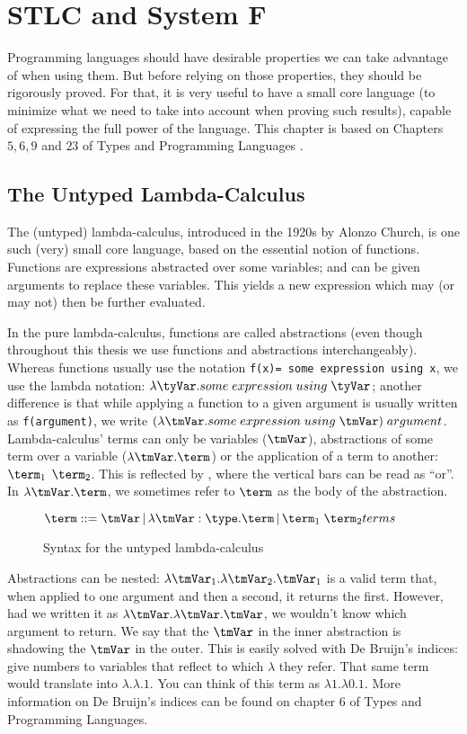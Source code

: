 \chapter{STLC and System F}
\label{cha:2}
Programming languages should have desirable properties we can take advantage of when using them. But before relying on those properties, they should be rigorously proved. For that, it is very useful to have a small core language (to minimize what we need to take into account when proving such results), capable of expressing the full power of the language. This chapter is based on Chapters $5,6,9$ and $23$ of Types and Programming Languages \cite{tapl}.

\section{The Untyped Lambda-Calculus}
The (untyped) lambda-calculus, introduced in the 1920s by Alonzo Church, is one such (very) small core language, based on the essential notion of functions. Functions are expressions abstracted over some variables; and can be given arguments to replace these variables. This yields a new expression which may (or may not) then be further evaluated.

In the pure lambda-calculus, functions are called abstractions (even though throughout this thesis we use functions and abstractions interchangeably). Whereas functions usually use the notation \texttt{f(x)= some expression using x}, we use the lambda notation: $\lambda \tyVar . some\;expression\;using\; \tyVar$; another difference is that while applying a function to a given argument is usually written as \texttt{f(argument)}, we write $(\lambda \tmVar . some\; expression\; using\;\tmVar) \; argument$. Lambda-calculus' terms can only be variables ($\tmVar$), abstractions of some term over a variable ($\lambda \tmVar. \term$) or the application of a term to another: $\term_1$ $\term_2$. This is reflected by , where the vertical bars can be read as ``or''. In $\lambda \tmVar. \term$, we sometimes refer to $\term$ as the body of the abstraction.

\begin{figure}
  \centering
  $\term ::= \tmVar\,|\,\lambda \tmVar:\type.\term\,|\,\term_1 \; \term_2  \hfill terms $\\
  \caption{Syntax for the untyped lambda-calculus}
  \label{untypedsyntax}
\end{figure}
Abstractions can be nested: $\lambda \tmVar_1. \lambda \tmVar_2 .\tmVar_1$ is a valid term that, when applied to one argument and then a second, it returns the first. However, had we written it as $\lambda \tmVar. \lambda \tmVar. \tmVar$, we wouldn't know which argument to return. We say that the $\tmVar$ in the inner abstraction is shadowing the $\tmVar$ in the outer. This is easily solved with De Bruijn's indices: give numbers to variables that reflect to which $\lambda$ they refer. That same term would translate into $\lambda .\lambda.1$. You can think of this term as $\lambda 1.\lambda 0.1$. More information on De Bruijn's indices can be found on chapter 6 of Types and Programming Languages\cite{tapl}.

